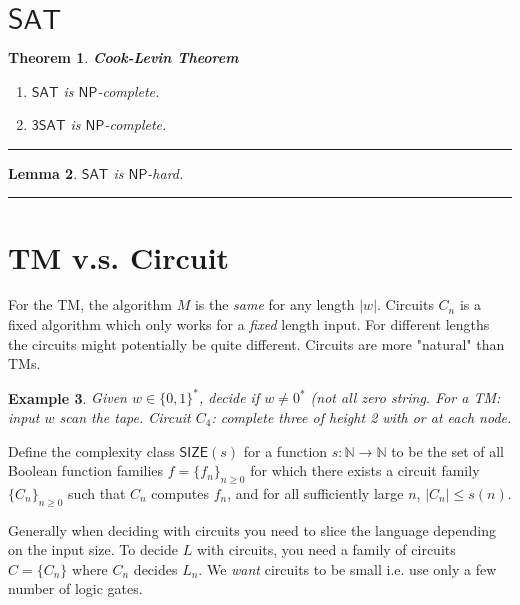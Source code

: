 \documentclass[twoside]{article}
\newcounter{lecnum}
\newtheorem{theorem}{Theorem}[lecnum]
\newtheorem{lemma}[theorem]{Lemma}
\newtheorem{example}[theorem]{Example}
\newenvironment{proof}{{\bf Proof:}}{\hfill\rule{2mm}{2mm}}
\def\N{\mathbb{N}}
\def\SIZE{\mathsf{SIZE}}
\begin{document}
\section{$\mathsf{SAT}$}
\begin{theorem}
\textbf{Cook-Levin Theorem} 
\begin{enumerate}
\item $\mathsf{SAT}$ is $\mathsf{NP}$-complete.
\item $\mathsf{3SAT}$ is $\mathsf{NP}$-complete.
\end{enumerate}
\end{theorem}
\begin{proof}

\end{proof}

\begin{lemma}
$\mathsf{SAT}$ is $\mathsf{NP}$-hard. 
\end{lemma}
\begin{proof}

\end{proof}

\section{TM v.s. Circuit}
For the TM, the algorithm $M$ is the \emph{same} for any length $|w|$. Circuits $C_n$ is a fixed algorithm which only works for a \emph{fixed} length input. For different lengths the circuits might potentially be quite different. Circuits are more "natural" than TMs.

\begin{example}
Given $w \in \{ 0,1 \} ^*$, decide if $w \neq 0^*$ (not all zero string. For a TM: input $w$ scan the tape. Circuit $C_4$: complete three of height 2 with or at each node. 
\end{example}

Define the complexity class $\SIZE (s)$ for a function $s: \N \rightarrow \N$ to be the set of all Boolean function families $f = \{f_n\}_{n\geq 0}$ for which there exists a circuit family $\{C_n\}_{n\geq 0}$ such that $C_n$ computes $f_n$, and for all sufficiently large $n$, $|C_n| \leq s(n)$.

Generally when deciding with circuits you need to slice the language depending on the input size. To decide $L$ with circuits, you need a family of circuits $C = \{C_n\}$ where $C_n$ decides $L_n$. We \emph{want} circuits to be small i.e. use only a few number of logic gates.
\end{document}

